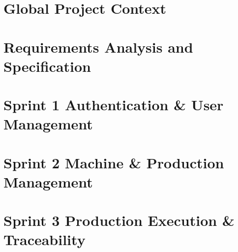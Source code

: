 \documentclass[12pt,a4paper]{report}
\begin{document}
\chapter{Global Project Context}
\graphicspath{{./media/MES_chapter-1-repport/}}
\minitoc
\newpage


\chapter{Requirements Analysis and Specification}
\graphicspath{{./media/MES_chapter-2-repport/}}
\minitoc
\newpage


\chapter{Sprint 1 Authentication \& User Management}
\graphicspath{{./media/MES_Sprint-1-Repport/}}
\minitoc
\newpage


\chapter{Sprint 2 Machine \& Production Management}
\graphicspath{{./media/MES_Sprint-2-Repport/}}
\minitoc
\newpage


\chapter{Sprint 3 Production Execution \& Traceability}
\graphicspath{{./media/MES_Sprint-3-Repport/}}
\minitoc
\newpage


\end{document}
